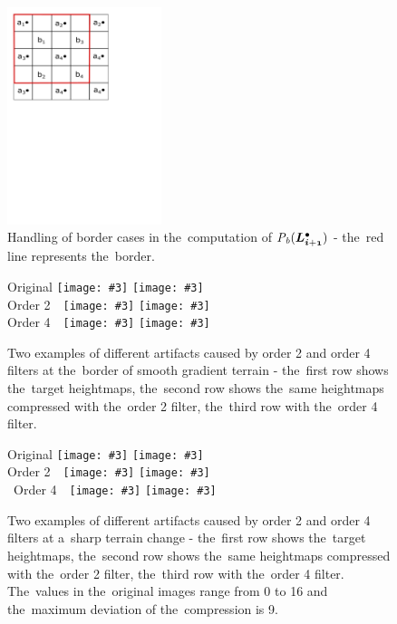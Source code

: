 \begin{figure}
	\includegraphics[trim={0 17cm 5cm 0}, clip, width=0.4\textwidth]{figures/extb.pdf}\centering
	\caption{Handling of border cases in the~computation of $\opnorm{P}{b}(\ldot{i+1})$ - the~red line represents the~border.}
	\label{fig:bborders}
\end{figure}

\newcommand{\incimg}[3]{\texttt{[image: \#3]}}
\newcommand{\incartifborder}[1]{\incimg{95}{70}{#1}}

\begin{figure}
	Original \incartifborder{figures/artif_orig0.png}
	\incartifborder{figures/artif_orig1.png}\\
	Order 2~~\incartifborder{figures/artif_four0.png}
	\incartifborder{figures/artif_four1.png}\\
	Order 4~~\incartifborder{figures/artif_twelve0.png}
	\incartifborder{figures/artif_twelve1.png}\\
	\caption{Two examples of different artifacts caused by order 2 and order 4 filters at the~border of smooth gradient terrain - the~first row shows the~target heightmaps, the~second row shows the~same heightmaps compressed with the~order 2 filter, the~third row with the~order 4 filter.}
	\label{fig:artifs_border}
\end{figure}

\newcommand{\incartifchange}[1]{\incimg{95}{95}{#1}}

\begin{figure}
	Original \incartifchange{figures/artif_change_orig0.png}
	\incartifchange{figures/artif_change_orig1.png}\\
	Order 2~~\incartifchange{figures/artif_change_four0.png}
	\incartifchange{figures/artif_change_four1.png}\\\
	Order 4~~\incartifchange{figures/artif_change_twelve0.png}
	\incartifchange{figures/artif_change_twelve1.png}\\
	\caption{Two examples of different artifacts caused by order 2 and order 4 filters at a~sharp terrain change - the~first row shows the~target heightmaps, the~second row shows the~same heightmaps compressed with the~order 2 filter, the~third row with the~order 4 filter. The~values in the~original images range from 0 to 16 and the~maximum deviation of the~compression is 9.}
	\label{fig:artifs_sharp_change}
\end{figure}

